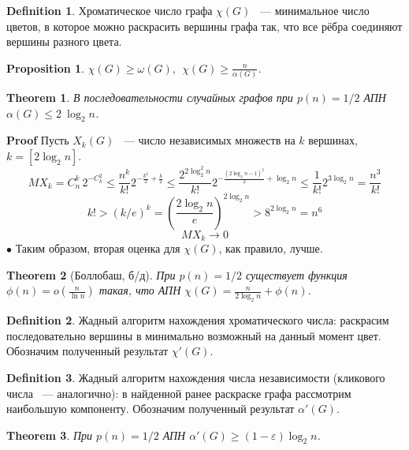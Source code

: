 \documentclass[a4paper]{article}
\theoremstyle{plain}
\newtheorem{theorem}{Theorem}
\newtheorem*{proposition-star}{Proposition}
\theoremstyle{remark}
\theoremstyle{definition}
\newtheorem*{definition-star}{Definition}
\renewenvironment{proof}{{\bfseries Proof}}{$\bullet$}
\newcommand{\myequat}[1]{\begin{equation} #1 \nonumber \end{equation}}
\newcommand{\pars}[1]{\left( #1 \right)} %
\begin{document}
\begin{definition-star} Хроматическое число графа $\chi(G)$ ~--- минимальное число цветов, в которое можно раскрасить вершины графа так, что все рёбра соединяют вершины разного цвета.
\end{definition-star}
\begin{proposition-star} $\chi(G)\geq \omega(G),\:\: \chi(G)\geq \frac{n}{\alpha(G)}$.
\end{proposition-star}
\begin{theorem} В последовательности случайных графов при $p(n)=1/2$ АПН $\alpha(G)\leq 2\: \log_2 n$.
\end{theorem}
\begin{proof} Пусть $X_k(G)$ ~--- число независимых множеств на $k$ вершинах, $k = [2\log_2 n]$. 
\myequat{MX_k=C_n^k\,2^{-C_k^2}\leq \frac{n^k}{k!}2^{-\frac{k^2}{2}+\frac{k}{2}}\leq \frac{2^{2 \log_2^2 n}}{k!}2^{-\frac{(2\log_2 n - 1)^2}{2}+\log_2 n}\leq\frac{1}{k!}2^{3\log_2 n}=\frac{n^3}{k!}}
\myequat{k!>(k/e)^k=\pars{\frac{2\log_2 n}{e}}^{2\log_2 n}>8^{2\log_2 n}=n^6}
\myequat{MX_k\to 0}
\end{proof}
Таким образом, вторая оценка для $\chi(G)$, как правило, лучше.
\begin{theorem}[Боллобаш, б/д] При $p(n)=1/2$ существует функция $\phi(n)=o\pars{\frac{n}{\ln n}}$ такая, что АПН $\chi(G)= \frac{n}{2\log_2 n}+\phi(n)$.
\end{theorem}
\begin{definition-star} Жадный алгоритм нахождения хроматического числа: раскрасим последовательно вершины в минимально возможный на данный момент цвет. Обозначим полученный результат $\chi'(G)$.
\end{definition-star}
\begin{definition-star} Жадный алгоритм нахождения числа независимости (кликового числа ~--- аналогично): в найденной ранее раскраске графа рассмотрим наибольшую компоненту. Обозначим полученный результат $\alpha'(G)$.
\end{definition-star}
\begin{theorem} При $p(n)=1/2$ АПН $\alpha'(G)\geq (1-\varepsilon)\log_2 n$.
\end{theorem}
\end{document}
